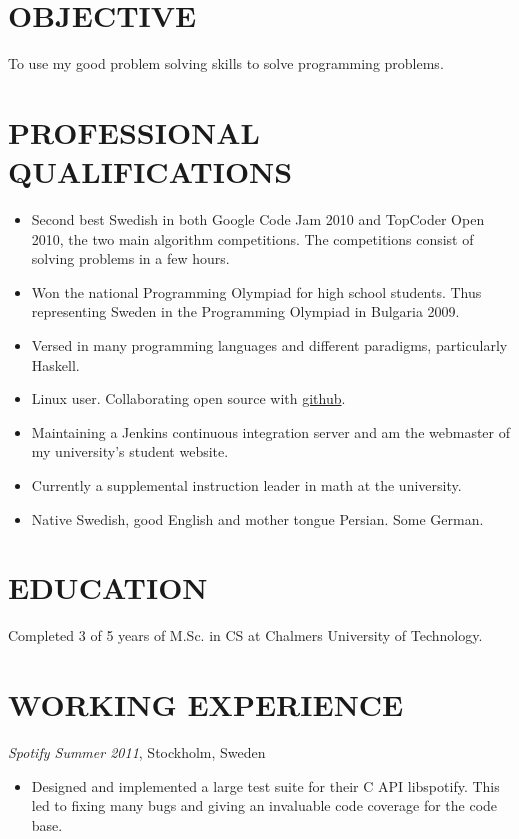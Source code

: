 \documentclass[11pt]{res} %
\begin{document}
\begin{resume}
                                               
 
\section{OBJECTIVE}
To use my good problem solving skills to solve programming problems.

\section{PROFESSIONAL QUALIFICATIONS} 
   \begin{itemize} %
   \item Second best Swedish in both
    Google Code Jam 2010 and TopCoder Open 2010,
    the two main algorithm competitions.
    The competitions consist of solving problems in a few hours.
   \item Won the national Programming Olympiad for high school students.
    Thus representing Sweden in the Programming Olympiad in Bulgaria 2009.
   \item Versed in many programming languages ​​and different paradigms,
    particularly Haskell.
   \item Linux user. Collaborating open source with \hyperref[https://github.com/Tarrasch]{github}.
   \item Maintaining a Jenkins continuous integration server 
    and am the webmaster of my university's student website.
   \item Currently a supplemental instruction leader in math at the university.
   \item Native Swedish, good English and mother tongue Persian. Some German.
 \end{itemize}
 
\section{EDUCATION} 
 \noindent Completed 3 of 5 years of M.Sc. in CS
  at Chalmers University of Technology.
 
\section{WORKING EXPERIENCE}
\emph{Spotify Summer 2011}, Stockholm, Sweden
\vspace{0.2in}
   \begin{itemize} %
   \item Designed and implemented a large test 
    suite for their C API libspotify.
    This led to fixing many bugs and giving an 
    invaluable code coverage for the code base.
 \end{itemize}



\end{resume}
\end{document}
